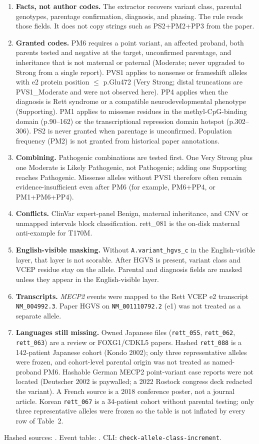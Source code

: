 \documentclass[12pt]{article}
\begin{document}
\begin{enumerate}
  \item \textbf{Facts, not author codes.} The extractor recovers variant
    class, parental genotypes, parentage confirmation, diagnosis, and
    phasing. The rule reads those fields. It does not copy strings such
    as PS2+PM2+PP3 from the paper.
  \item \textbf{Granted codes.} PM6 requires a point variant, an affected
    proband, both parents tested and negative at the target, unconfirmed
    parentage, and inheritance that is not maternal or paternal (Moderate;
    never upgraded to Strong from a single report). PVS1 applies to
    nonsense or frameshift alleles with e2 protein position $\leq$ p.Glu472
    (Very Strong; distal truncations are PVS1\_Moderate and were not
    observed here). PP4 applies when the diagnosis is Rett syndrome or a
    compatible neurodevelopmental phenotype (Supporting). PM1 applies to
    missense residues in the methyl-CpG-binding domain (p.90--162) or the
    transcriptional repression domain hotspot (p.302--306). PS2 is never
    granted when parentage is unconfirmed. Population frequency (PM2) is
    not granted from historical paper annotations.
  \item \textbf{Combining.} Pathogenic combinations are tested first.
    One Very Strong plus one Moderate is Likely Pathogenic, not
    Pathogenic; adding one Supporting reaches Pathogenic. Missense
    alleles without PVS1 therefore often remain evidence-insufficient
    even after PM6 (for example, PM6+PP4, or PM1+PM6+PP4).
  \item \textbf{Conflicts.} ClinVar expert-panel Benign, maternal
    inheritance, and CNV or unmapped intervals block classification.
    rett\_081 is the on-disk maternal anti-example for T170M.
  \item \textbf{English-visible masking.} Without \texttt{A.variant\_hgvs\_c}
    in the English-visible layer, that layer is not scorable. After HGVS
    is present, variant class and VCEP residue stay on the allele.
    Parental and diagnosis fields are masked unless they appear in the
    English-visible layer.
  \item \textbf{Transcripts.} \textit{MECP2} events were mapped to the
    Rett VCEP e2 transcript \texttt{NM\_004992.3}. Paper HGVS on
    \texttt{NM\_001110792.2} (e1) was not treated as a separate allele.
  \item \textbf{Languages still missing.} Owned Japanese files
    (\texttt{rett\_055}, \texttt{rett\_062}, \texttt{rett\_063}) are a
    review or FOXG1/CDKL5 papers. Hashed \texttt{rett\_088} is a
    142-patient Japanese cohort (Kondo 2002); only three representative
    alleles were frozen, and cohort-level parental origin was not treated
    as named-proband PM6. Hashable German MECP2 point-variant case
    reports were not located (Deutscher 2002 is paywalled; a 2022 Rostock
    congress deck redacted the variant).
    A French source is a 2018 conference poster, not a journal article.
    Korean \texttt{rett\_067} is a 34-patient cohort without parental
    testing; only three representative alleles were frozen so the table
    is not inflated by every row of Table~2.
\end{enumerate}

Hashed sources: .
Event table:
.
CLI: \texttt{check-allele-class-increment}.
\end{document}
